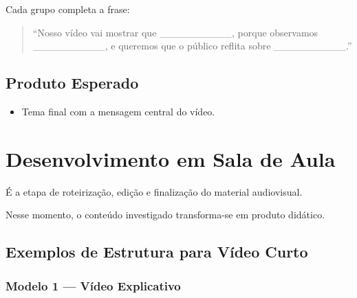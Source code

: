 \documentclass[
  letterpaper,
  DIV=11,
  numbers=noendperiod]{scrreport}
\providecommand{\tightlist}{%
  \setlength{\itemsep}{0pt}\setlength{\parskip}{0pt}}
\begin{document}
\begin{tcolorbox}[enhanced jigsaw, arc=.35mm, bottomrule=.15mm, bottomtitle=1mm, breakable, colback=white, colbacktitle=quarto-callout-tip-color!10!white, colframe=quarto-callout-tip-color-frame, coltitle=black, left=2mm, leftrule=.75mm, opacityback=0, opacitybacktitle=0.6, rightrule=.15mm, title=\textcolor{quarto-callout-tip-color}{\faLightbulb}\hspace{0.5em}{Atividade Prática}, titlerule=0mm, toprule=.15mm, toptitle=1mm]

Cada grupo completa a frase:

\begin{quote}
``Nosso vídeo vai mostrar que \_\_\_\_\_\_\_\_\_\_, porque observamos
\_\_\_\_\_\_\_\_\_\_, e queremos que o público reflita sobre
\_\_\_\_\_\_\_\_\_\_.''
\end{quote}

\subsection{Produto Esperado}\label{produto-esperado-5}

\begin{itemize}
\tightlist
\item
  Tema final com a mensagem central do vídeo.
\end{itemize}

\end{tcolorbox}

\section{Desenvolvimento em Sala de
Aula}\label{desenvolvimento-em-sala-de-aula}

É a etapa de roteirização, edição e finalização do material audiovisual.

Nesse momento, o conteúdo investigado transforma-se em produto didático.

\subsection{Exemplos de Estrutura para Vídeo
Curto}\label{exemplos-de-estrutura-para-vuxeddeo-curto}

\subsubsection{Modelo 1 --- Vídeo
Explicativo}\label{modelo-1-vuxeddeo-explicativo}
\end{document}
